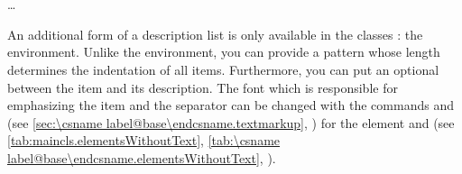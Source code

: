 \fi%
%
%
%
\fi %

\begin{Declaration}
  \\
  \quad{}\\
  \quad\dots\\
\end{Declaration}%
%
%
An additional form of a description list is only available in the
{\KOMAScript} classes%
: the
 environment. Unlike the
 environment, you can provide a pattern whose length
determines the indentation of all items. Furthermore, you can put an optional
 between the item and its description.  The
font%
 which is responsible for emphasizing the item and the separator can be changed
with the commands  and  (see \autoref{sec:\csname
  label@base\endcsname.textmarkup}, ) for the element
 and
 (see
\ifCommonscrextend
\autoref{tab:maincls.elementsWithoutText},
\else
\autoref{tab:\csname label@base\endcsname.elementsWithoutText},
%
\fi).
\ifCommonscrlttr\par\else
